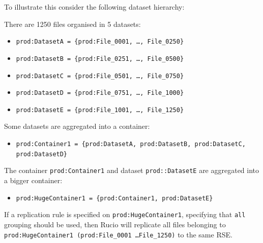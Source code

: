 \documentclass{atlasnote}
\begin{document}
To illustrate this consider the following dataset hierarchy:

{\hfill{}\hfill}

There are 1250 files organised in 5 datasets:
\begin{itemize}
\item[] \texttt{prod:DatasetA = \{prod:File\_0001, \ldots, File\_0250\}}
\item[] \texttt{prod:DatasetB = \{prod:File\_0251, \ldots, File\_0500\}}
\item[] \texttt{prod:DatasetC = \{prod:File\_0501, \ldots, File\_0750\}}
\item[] \texttt{prod:DatasetD = \{prod:File\_0751, \ldots, File\_1000\}}
\item[] \texttt{prod:DatasetE = \{prod:File\_1001, \ldots, File\_1250\}}
\end{itemize}

Some datasets are aggregated into a container:
\begin{itemize}
\item[] \texttt{prod:Container1 = \{prod:DatasetA, prod:DatasetB, prod:DatasetC, prod:DatasetD\}}
\end{itemize}

The container \texttt{prod:Container1} and dataset \texttt{prod::DatasetE} are aggregated into a bigger container:
\begin{itemize}
\item[] \texttt{prod:HugeContainer1 = \{prod:Container1, prod:DatasetE\}}
\end{itemize}

If a replication rule is specified on \texttt{prod:HugeContainer1}, specifying that \texttt{all} grouping should be used, then Rucio will replicate all files belonging to \texttt{prod:HugeContainer1 (prod:File\_0001 \dots File\_1250)} to the same RSE.
\end{document}
